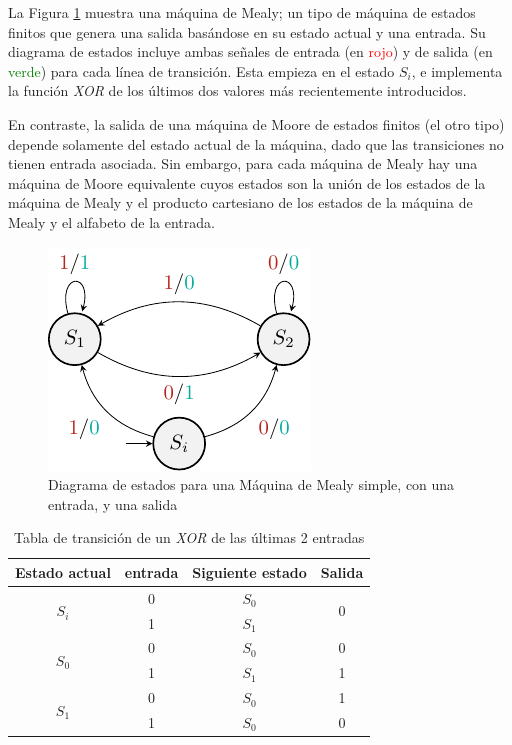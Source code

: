 \documentclass[journal,trans]{IEEEtran}
\begin{document}
	La Figura \ref{fig:machineMealy} muestra una máquina de Mealy; un tipo de máquina de estados finitos que genera una salida basándose en su estado actual y una entrada. Su diagrama de estados incluye ambas señales de entrada (en \textcolor{red}{rojo}) y de salida (en \textcolor{green}{verde}) para cada línea de transición. Esta empieza en el estado $S_{i}$, e implementa la función \emph{XOR} de los últimos dos valores m\'as recientemente introducidos.
	
	En contraste, la salida de una máquina de Moore de estados finitos (el otro tipo) depende solamente del estado actual de la máquina, dado que las transiciones no tienen entrada asociada. Sin embargo, para cada máquina de Mealy hay una máquina de Moore equivalente cuyos estados son la unión de los estados de la máquina de Mealy y el producto cartesiano de los estados de la máquina de Mealy y el alfabeto de la entrada.
	
	\begin{figure}[h]
		\centering
		\includegraphics{./imagenes/machineMealy.pdf}
		\caption{Diagrama de estados para una Máquina de Mealy simple, con una entrada, y una salida}
		\label{fig:machineMealy}
	\end{figure}
	
	\begin{table}[h]
		\centering
		\bgroup
		\def\arraystretch{1.5}
		\begin{tabular}{|c|c|c|c|}
			\hline
			Estado actual & entrada & Siguiente estado & Salida \\
			\hline
			\multirow{2}{*}{$S_{i}$} & 0 & $S_{0}$ & \multirow{2}{*}{0} \\
			\cline{2-3}
			& 1 & $S_{1}$ &  \\
			\hline
			\multirow{2}{*}{$S_{0}$} & 0 & $S_{0}$ & 0 \\
			\cline{2-4}
			& 1 & $S_{1}$ & 1 \\
			\hline
			\multirow{2}{*}{$S_{1}$} & 0 & $S_{0}$ & 1 \\
			\cline{2-4}
			& 1 & $S_{0}$ & 0 \\
			\hline
		\end{tabular}
		\egroup
		\caption{Tabla de transición de un \textit{XOR} de las últimas 2 entradas}
		\label{tab:tableMealy}
	\end{table}
	
\end{document}
